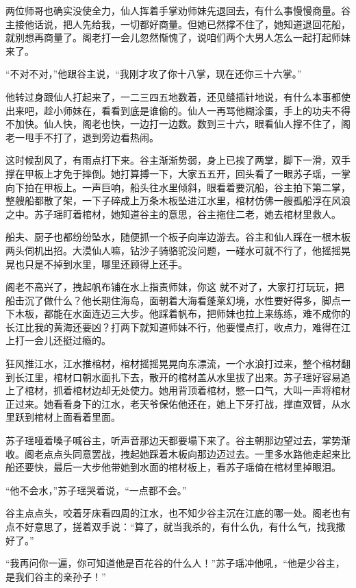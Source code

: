 两位师哥也确实没使全力，仙人挥着手掌劝师妹先退回去，有什么事慢慢商量。谷主接他话说，把人先给我，一切都好商量。但她已然撑不住了，她知道退回花船，就别想再商量了。阁老打一会儿忽然惭愧了，说咱们两个大男人怎么一起打起师妹来了。


“不对不对，”他跟谷主说，“我刚才攻了你十八掌，现在还你三十六掌。”

他转过身跟仙人打起来了，一二三四五地数着，还见缝插针地说，有什么本事都使出来吧，趁小师妹在，看看到底是谁偷的。仙人一再骂他糊涂蛋，手上的功夫不得不加快。仙人快，阁老也快，一边打一边数。数到三十六，眼看仙人撑不住了，阁老一甩手不打了，退到旁边看热闹。

这时候刮风了，有雨点打下来。谷主渐渐势弱，身上已挨了两掌，脚下一滑，双手撑在甲板上才免于摔倒。她打算搏一下，大家五五开，回头看了一眼苏子瑶，一掌向下拍在甲板上。一声巨响，船头往水里倾斜，眼看着要沉船，谷主拍下第二掌，整艘船都散了架，一下子碎成上万条木板坠进江水里，棺材仿佛一艘孤船浮在风浪之中。苏子瑶盯着棺材，她知道谷主的意思，谷主拖住二老，她去棺材里救人。

船夫、厨子也都纷纷坠水，随便抓一个板子向岸边游去。谷主和仙人踩在一根木板两头伺机出招。大漠仙人嘛，钻沙子骑骆驼没问题，一碰水可就不行了，他摇摇晃晃也只是不掉到水里，哪里还顾得上还手。

阁老不高兴了，拽起帆布铺在水上指责师妹，你这
就不对了，大家打打玩玩，把船击沉了做什么？他长期住海岛，面朝着大海看蓬莱幻境，水性要好得多，脚点一下木板，都能在水面连迈三大步。他踩着帆布，把师妹也拉上来练练，难不成你的长江比我的黄海还要凶？打两下就知道师妹不行，他要慢点打，收点力，难得在江上打一会儿还挺过瘾的。

狂风推江水，江水推棺材，棺材摇摇晃晃向东漂流，一个水浪打过来，整个棺材翻到长江里，棺材口朝水面扎下去，散开的棺材盖从水里拔了出来。苏子瑶好容易追上了棺材，抓着棺材边却无处使力。她用背顶着棺材，憋一口气，大叫一声将棺材正过来。她看看身下的江水，老天爷保佑他还在，她上下牙打战，撑直双臂，从水里跃到棺材上面看着里面。

苏子瑶哑着嗓子喊谷主，听声音那边天都要塌下来了。谷主朝那边望过去，掌势渐收。阁老点点头同意罢战，拽起她踩着木板向那边迈过去。一里多水路他走起来比船还要快，最后一大步他带她到水面的棺材板上，看苏子瑶倚在棺材里掉眼泪。

“他不会水，”苏子瑶哭着说，“一点都不会。”

谷主点点头，咬着牙床看四周的江水，也不知少谷主沉在江底的哪一处。阁老也有点不好意思了，搓着双手说：“算了，就当我杀的，有什么仇，有什么气，找我撒好了。”

“我再问你一遍，你可知道他是百花谷的什么人！”苏子瑶冲他吼，“他是少谷主，是我们谷主的亲孙子！”
\newline

